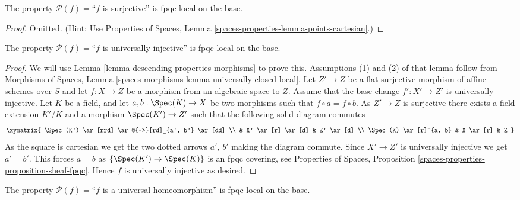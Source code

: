 \begin{lemma}
\label{lemma-descending-property-surjective}
The property $\mathcal{P}(f) =$``$f$ is surjective''
is fpqc local on the base.
\end{lemma}

\begin{proof}
Omitted. (Hint: Use
Properties of Spaces, Lemma \ref{spaces-properties-lemma-points-cartesian}.)
\end{proof}

\begin{lemma}
\label{lemma-descending-property-universally-injective}
The property $\mathcal{P}(f) =$``$f$ is universally injective''
is fpqc local on the base.
\end{lemma}

\begin{proof}
We will use
Lemma \ref{lemma-descending-properties-morphisms}
to prove this. Assumptions (1) and (2) of that lemma follow from
Morphisms of Spaces,
Lemma \ref{spaces-morphisms-lemma-universally-closed-local}.
Let $Z' \to Z$ be a flat surjective morphism of affine schemes
over $S$ and let $f : X \to Z$ be a morphism from an algebraic space to $Z$.
Assume that the base change $f' : X' \to Z'$ is universally injective.
Let $K$ be a field, and let $a, b : \Spec(K) \to X$
be two morphisms such that $f \circ a = f \circ b$.
As $Z' \to Z$ is surjective there exists a field
extension $K'/K$ and a morphism
$\Spec(K') \to Z'$
such that the following solid diagram commutes
$$
\xymatrix{
\Spec(K') \ar[rrd] \ar@{-->}[rd]_{a', b'} \ar[dd] \\
 &
X' \ar[r] \ar[d] &
Z' \ar[d] \\
\Spec(K) \ar[r]^{a, b} &
X \ar[r] &
Z
}
$$
As the square is cartesian we get the two dotted arrows $a'$, $b'$ making the
diagram commute. Since $X' \to Z'$ is universally injective we get $a' = b'$.
This forces $a = b$ as $\{\Spec(K') \to \Spec(K)\}$
is an fpqc covering, see
Properties of Spaces, Proposition
\ref{spaces-properties-proposition-sheaf-fpqc}.
Hence $f$ is universally injective as desired.
\end{proof}

\begin{lemma}
\label{lemma-descending-property-universal-homeomorphism}
The property $\mathcal{P}(f) =$``$f$ is a universal homeomorphism''
is fpqc local on the base.
\end{lemma}

